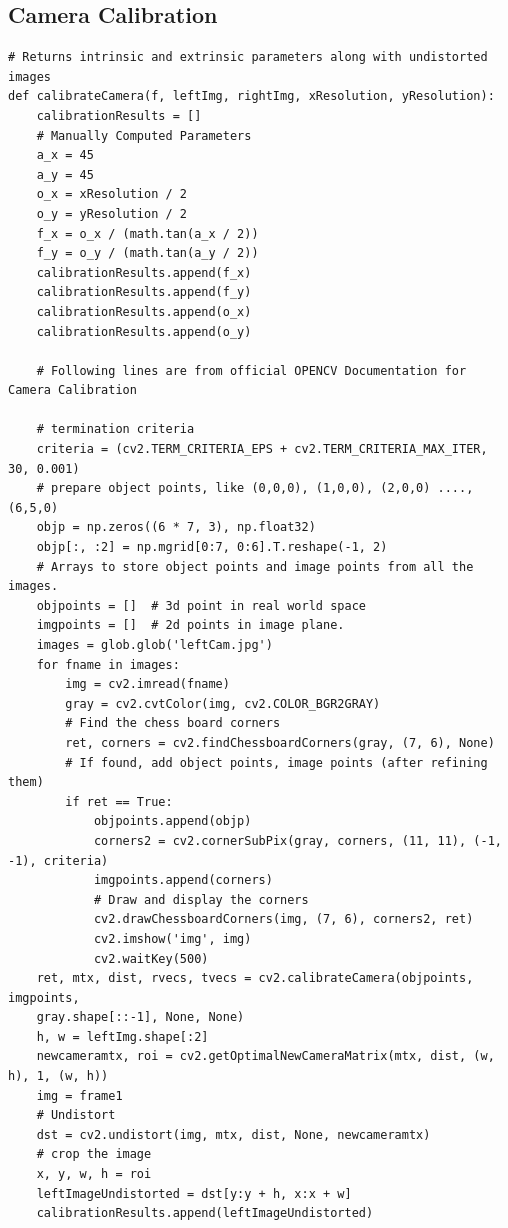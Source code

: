 \documentclass[11pt]{scrartcl}
\begin{document}
\subsection{Camera Calibration}
\begin{verbatim}
# Returns intrinsic and extrinsic parameters along with undistorted images
def calibrateCamera(f, leftImg, rightImg, xResolution, yResolution):
    calibrationResults = []
    # Manually Computed Parameters
    a_x = 45
    a_y = 45
    o_x = xResolution / 2
    o_y = yResolution / 2
    f_x = o_x / (math.tan(a_x / 2))
    f_y = o_y / (math.tan(a_y / 2))
    calibrationResults.append(f_x)
    calibrationResults.append(f_y)
    calibrationResults.append(o_x)
    calibrationResults.append(o_y)

    # Following lines are from official OPENCV Documentation for Camera Calibration

    # termination criteria
    criteria = (cv2.TERM_CRITERIA_EPS + cv2.TERM_CRITERIA_MAX_ITER, 30, 0.001)
    # prepare object points, like (0,0,0), (1,0,0), (2,0,0) ....,(6,5,0)
    objp = np.zeros((6 * 7, 3), np.float32)
    objp[:, :2] = np.mgrid[0:7, 0:6].T.reshape(-1, 2)
    # Arrays to store object points and image points from all the images.
    objpoints = []  # 3d point in real world space
    imgpoints = []  # 2d points in image plane.
    images = glob.glob('leftCam.jpg')
    for fname in images:
        img = cv2.imread(fname)
        gray = cv2.cvtColor(img, cv2.COLOR_BGR2GRAY)
        # Find the chess board corners
        ret, corners = cv2.findChessboardCorners(gray, (7, 6), None)
        # If found, add object points, image points (after refining them)
        if ret == True:
            objpoints.append(objp)
            corners2 = cv2.cornerSubPix(gray, corners, (11, 11), (-1, -1), criteria)
            imgpoints.append(corners)
            # Draw and display the corners
            cv2.drawChessboardCorners(img, (7, 6), corners2, ret)
            cv2.imshow('img', img)
            cv2.waitKey(500)
    ret, mtx, dist, rvecs, tvecs = cv2.calibrateCamera(objpoints, imgpoints, 
    gray.shape[::-1], None, None)
    h, w = leftImg.shape[:2]
    newcameramtx, roi = cv2.getOptimalNewCameraMatrix(mtx, dist, (w, h), 1, (w, h))
    img = frame1
    # Undistort
    dst = cv2.undistort(img, mtx, dist, None, newcameramtx)
    # crop the image
    x, y, w, h = roi
    leftImageUndistorted = dst[y:y + h, x:x + w]
    calibrationResults.append(leftImageUndistorted)


\end{verbatim}
\end{document}
